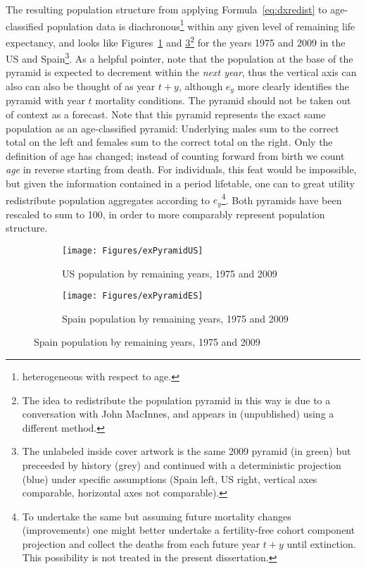  \FloatBarrier
\label{sec:expopstruct1}
The resulting
population structure from applying Formula~\eqref{eq:dxredist} to age-classified
population data is diachronous\footnote{heterogeneous with respect to age.} 
within any given level of remaining life expectancy, and 
looks like Figures~\ref{fig:exPyrUS} and \ref{fig:exPyrES}\footnote{The idea to
redistribute the population pyramid in this way is due to a conversation with 
John MacInnes, and appears in \citep{MacInnes2013pop} (unpublished) using a
different method.} for the years 1975 and 2009 in the US and
Spain\footnote{The unlabeled inside cover artwork is the same 2009 pyramid (in
green) but preceeded by history (grey) and continued with a deterministic
projection (blue) under specific assumptions (Spain left, US right, vertical
axes comparable, horizontal axes not comparable).}. As a helpful pointer, note that the
population at the base of the pyramid is expected to decrement within the \textit{next year}, thus the vertical axis can also can also be thought of as year $t+y$, although $e_y$ more clearly identifies the pyramid with year $t$ mortality conditions. The pyramid should not be taken out of context as a forecast. Note that this pyramid represents the exact same
population as an age-classified pyramid: Underlying males sum to the correct total on 
the left and females sum to the correct total on the right. Only the definition of age has
changed; instead of counting forward from birth we count \textit{age} in reverse
starting from death. For individuals, this feat would be impossible, but given
 the information contained in a period lifetable, one can to great utility 
 redistribute population aggregates according to $e_y$\footnote{To undertake
 the same but assuming future mortality changes (improvements) one might
 better undertake a fertility-free cohort component projection and collect the
 deaths from each future year $t+y$ until extinction. This possibility is not
 treated in the present dissertation.}. Both pyramids have been rescaled
 to sum to 100, in order to more comparably represent population structure.

\begin{figure}
        \centering
        \begin{subfigure}
                \centering
                \caption{US population by remaining years, 1975 and 2009}
                \texttt{[image: Figures/exPyramidUS]}
                \label{fig:exPyrUS}
        \end{subfigure}
        \begin{subfigure}
                \centering
                \caption{Spain population by remaining years, 1975 and 2009}
                \texttt{[image: Figures/exPyramidES]}
               
                \label{fig:exPyrES}
        \end{subfigure}
\end{figure}

